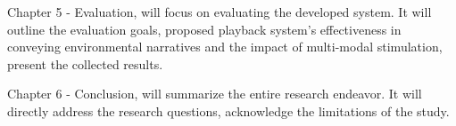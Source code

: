     Chapter 5 - Evaluation, will focus on evaluating the developed system. It will outline the evaluation goals, proposed playback system's effectiveness in conveying environmental narratives and the impact of multi-modal stimulation, present the collected results.\par

    Chapter 6 - Conclusion, will summarize the entire research endeavor. It will directly address the research questions, acknowledge the limitations of the study.\par